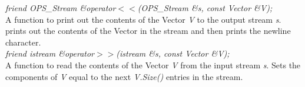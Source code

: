 {\em friend OPS_Stream \&operator$<<$(OPS_Stream \&s, const Vector \&V);} \\
A function to print out the contents of the Vector {\em V} to the
output stream {\em s}. prints out the contents of the Vector in the
stream and then prints the newline character. \\

{\em friend istream \&operator$>>$(istream \&s, const Vector \&V);} \\
A function to read the contents of the Vector {\em V} from the input
stream {\em s}. Sets the components of {\em V} equal to the next {\em
V.Size()} entries in the stream.\\ 





